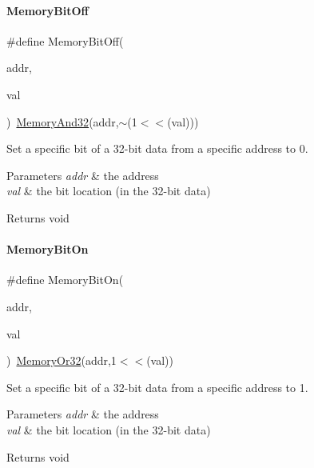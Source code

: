 \paragraph{\texorpdfstring{Memory\+Bit\+Off}{MemoryBitOff}}
{\footnotesize\ttfamily \#define Memory\+Bit\+Off(\begin{DoxyParamCaption}\item[{}]{addr,  }\item[{}]{val }\end{DoxyParamCaption})~\mbox{\hyperlink{a00020_ad87cedffcaadc51db22594fce55173d4}{Memory\+And32}}(addr,$\sim$(1$<$$<$(val)))}



Set a specific bit of a 32-\/bit data from a specific address to 0. 


\begin{DoxyParams}{Parameters}
{\em addr} & the address \\
\hline
{\em val} & the bit location (in the 32-\/bit data) \\
\hline
\end{DoxyParams}
\begin{DoxyReturn}{Returns}
void 
\end{DoxyReturn}
\mbox{\label{a00020_a99a602346038b54068758ef00c42d1b6}} 
\paragraph{\texorpdfstring{Memory\+Bit\+On}{MemoryBitOn}}
{\footnotesize\ttfamily \#define Memory\+Bit\+On(\begin{DoxyParamCaption}\item[{}]{addr,  }\item[{}]{val }\end{DoxyParamCaption})~\mbox{\hyperlink{a00020_a27874a97deab7cecdde5ddecf466e31e}{Memory\+Or32}}(addr,1$<$$<$(val))}



Set a specific bit of a 32-\/bit data from a specific address to 1. 


\begin{DoxyParams}{Parameters}
{\em addr} & the address \\
\hline
{\em val} & the bit location (in the 32-\/bit data) \\
\hline
\end{DoxyParams}
\begin{DoxyReturn}{Returns}
void 
\end{DoxyReturn}
\mbox{\label{a00020_ae49e41753dbce64185d380d307ade78d}} 
